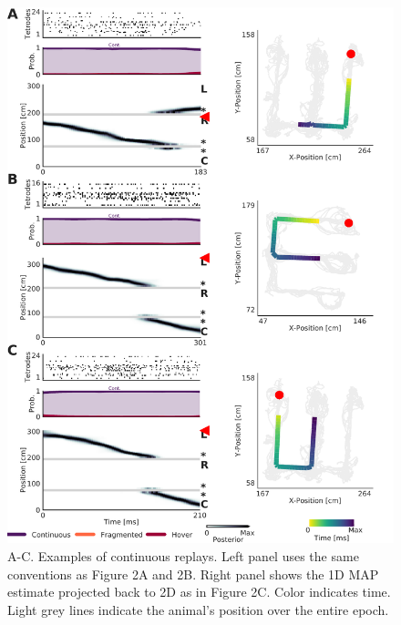 \documentclass[times, twoside]{zHenriquesLab-StyleBioRxiv}
\begin{document}
\begin{figure}%
\centering
\includegraphics[width=0.80\linewidth]{figures/Figure2-supplemental2/Figure2_v2-supplemental2}
\caption{A-C. Examples of continuous replays. Left panel uses the same conventions as Figure 2A and 2B. Right panel shows the 1D MAP estimate projected back to 2D as in Figure 2C. Color indicates time. Light grey lines indicate the animal's position over the entire epoch.}
\label{fig:Figure2-Figure supplement 2}
\end{figure}
\end{document}
